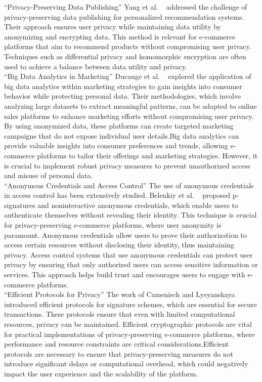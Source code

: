 \documentclass[12pt]{article}
\begin{document}
“Privacy-Preserving Data Publishing” Yang et al. ~\cite{Yang2018} addressed the challenge of privacy-preserving data publishing for personalized recommendation systems. Their approach ensures user privacy while maintaining data utility by anonymizing and encrypting data. This method is relevant for e-commerce platforms that aim to recommend products without compromising user privacy. Techniques such as differential privacy and homomorphic encryption are often used to achieve a balance between data utility and privacy.\\

“Big Data Analytics in Marketing” Ducange et al. ~\cite{Ducange2018} explored the application of big data analytics within marketing strategies to gain insights into consumer behavior while protecting personal data. Their methodologies, which involve analyzing large datasets to extract meaningful patterns, can be adapted to online sales platforms to enhance marketing efforts without compromising user privacy. By using anonymized data, these platforms can create targeted marketing campaigns that do not expose individual user details.Big data analytics can provide valuable insights into consumer preferences and trends, allowing e-commerce platforms to tailor their offerings and marketing strategies. However, it is crucial to implement robust privacy measures to prevent unauthorized access and misuse of personal data.\\

“Anonymous Credentials and Access Control” The use of anonymous credentials in access control has been extensively studied. Belenkiy et al. ~\cite{Belenkiy2008} proposed p-signatures and noninteractive anonymous credentials, which enable users to authenticate themselves without revealing their identity. This technique is crucial for privacy-preserving e-commerce platforms, where user anonymity is paramount. Anonymous credentials allow users to prove their authorization to access certain resources without disclosing their identity, thus maintaining privacy. Access control systems that use anonymous credentials can protect user privacy by ensuring that only authorized users can access sensitive information or services. This approach helps build trust and encourages users to engage with e-commerce platforms.\\

“Efficient Protocols for Privacy” The work of Camenisch and Lysyanskaya ~\cite{Camenisch2002} introduced efficient protocols for signature schemes, which are essential for secure transactions. These protocols ensure that even with limited computational resources, privacy can be maintained. Efficient cryptographic protocols are vital for practical implementations of privacy-preserving e-commerce platforms, where performance and resource constraints are critical considerations.Efficient protocols are necessary to ensure that privacy-preserving measures do not introduce significant delays or computational overhead, which could negatively impact the user experience and the scalability of the platform.\\
\end{document}
